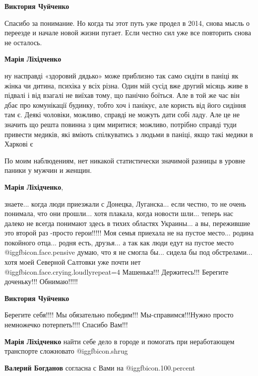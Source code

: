 \begin{itemize}
\begin{itemize}
\textbf{Виктория Чуйченко} 

Спасибо за понимание. Но когда ты этот путь уже продел в 2014, снова мысль о
переезде и начале новой жизни пугает. Если честно сил уже все повторить снова
не осталось.

\textbf{Марія Ліхідченко} 

ну насправді «здоровий дядько» може приблизно так само сидіти в паніці як жінка
чи дитина, психіка у всіх різна. Один мій сусід вже другий місяць живе в
підвалі і від взагалі не виїхав тому, що панічно боїться. Але в той же час він
дбає про комунікації будинку, тобто хоч і панікує, але користь від його сидіння
там є. Деякі чоловіки, можливо, справді не можуть дати собі ладу. Але це не
значить що решта повинна з цим миритися; можливо, потрібно справді туди
привести медиків, які вміють спілкуватись з людьми в паніці, якщо такі медики в
Харкові є

По моим наблюдениям, нет никакой статистически значимой разницы в уровне паники у мужчин и женщин.

\textbf{Марія Ліхідченко},

знаете... когда люди приезжали с Донецка, Луганска... если честно, то не очень
понимала, что они прошли... хотя плакала, когда новости шли... теперь нас далеко не
всегда понимают здесь в тихих областях Украины... а вы, пережившие это второй раз
-просто герои!!!!! Моя семья приехала не на пустое место... родина покойного
отца... родня есть, друзья... а так как люди едут на пустое место @igg{fbicon.face.pensive} думаю, что я не
смогла бы... сидела бы под обстрелами... хотя моей Северной Салтовки уже почти
нет @igg{fbicon.face.crying.loudly}{repeat=4} Машенька!!! Держитесь!!! Берегите доченьку!!! Обнимаю!!!!!

\textbf{Виктория Чуйченко} 

Берегите себя!!!! Мы обязательно победим!!! Мы-справимся!!!Нужно просто
немножечко потерпеть!!!! Спасибо Вам!!!

\textbf{Марія Ліхідченко} найти себе дело в городе и помогать при неработающем транспорте сложновато  @igg{fbicon.shrug} 

\textbf{Валерий Богданов} согласна с Вами на  @igg{fbicon.100.percent} 

\end{itemize} %



\end{itemize}
